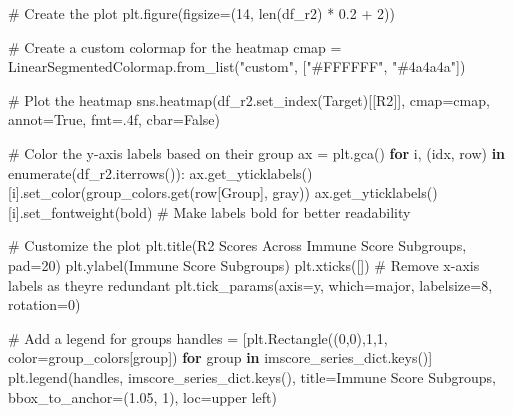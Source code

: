\documentclass[
  letterpaper,
  DIV=11,
  numbers=noendperiod]{scrartcl}
\newenvironment{Shaded}{\begin{snugshade}}{\end{snugshade}}
\newcommand{\BuiltInTok}[1]{\textcolor[rgb]{0.00,0.23,0.31}{#1}}
\newcommand{\CommentTok}[1]{\textcolor[rgb]{0.37,0.37,0.37}{#1}}
\newcommand{\ControlFlowTok}[1]{\textcolor[rgb]{0.00,0.23,0.31}{\textbf{#1}}}
\newcommand{\DecValTok}[1]{\textcolor[rgb]{0.68,0.00,0.00}{#1}}
\newcommand{\FloatTok}[1]{\textcolor[rgb]{0.68,0.00,0.00}{#1}}
\newcommand{\KeywordTok}[1]{\textcolor[rgb]{0.00,0.23,0.31}{\textbf{#1}}}
\newcommand{\NormalTok}[1]{\textcolor[rgb]{0.00,0.23,0.31}{#1}}
\newcommand{\OperatorTok}[1]{\textcolor[rgb]{0.37,0.37,0.37}{#1}}
\newcommand{\StringTok}[1]{\textcolor[rgb]{0.13,0.47,0.30}{#1}}
\newcommand{\VariableTok}[1]{\textcolor[rgb]{0.07,0.07,0.07}{#1}}
\begin{document}
\begin{Shaded}
\begin{Highlighting}[]
\CommentTok{\# Create the plot}
\NormalTok{plt.figure(figsize}\OperatorTok{=}\NormalTok{(}\DecValTok{14}\NormalTok{, }\BuiltInTok{len}\NormalTok{(df\_r2) }\OperatorTok{*} \FloatTok{0.2} \OperatorTok{+} \DecValTok{2}\NormalTok{))}

\CommentTok{\# Create a custom colormap for the heatmap}
\NormalTok{cmap }\OperatorTok{=}\NormalTok{ LinearSegmentedColormap.from\_list(}\StringTok{"custom"}\NormalTok{, [}\StringTok{"\#FFFFFF"}\NormalTok{, }\StringTok{"\#4a4a4a"}\NormalTok{])}

\CommentTok{\# Plot the heatmap}
\NormalTok{sns.heatmap(df\_r2.set\_index(}\StringTok{\textquotesingle{}Target\textquotesingle{}}\NormalTok{)[[}\StringTok{\textquotesingle{}R2\textquotesingle{}}\NormalTok{]], cmap}\OperatorTok{=}\NormalTok{cmap, annot}\OperatorTok{=}\VariableTok{True}\NormalTok{, fmt}\OperatorTok{=}\StringTok{\textquotesingle{}.4f\textquotesingle{}}\NormalTok{, cbar}\OperatorTok{=}\VariableTok{False}\NormalTok{)}

\CommentTok{\# Color the y{-}axis labels based on their group}
\NormalTok{ax }\OperatorTok{=}\NormalTok{ plt.gca()}
\ControlFlowTok{for}\NormalTok{ i, (idx, row) }\KeywordTok{in} \BuiltInTok{enumerate}\NormalTok{(df\_r2.iterrows()):}
\NormalTok{    ax.get\_yticklabels()[i].set\_color(group\_colors.get(row[}\StringTok{\textquotesingle{}Group\textquotesingle{}}\NormalTok{], }\StringTok{\textquotesingle{}gray\textquotesingle{}}\NormalTok{))}
\NormalTok{    ax.get\_yticklabels()[i].set\_fontweight(}\StringTok{\textquotesingle{}bold\textquotesingle{}}\NormalTok{)  }\CommentTok{\# Make labels bold for better readability}

\CommentTok{\# Customize the plot}
\NormalTok{plt.title(}\StringTok{\textquotesingle{}R2 Scores Across Immune Score Subgroups\textquotesingle{}}\NormalTok{, pad}\OperatorTok{=}\DecValTok{20}\NormalTok{)}
\NormalTok{plt.ylabel(}\StringTok{\textquotesingle{}Immune Score Subgroups\textquotesingle{}}\NormalTok{)}
\NormalTok{plt.xticks([])  }\CommentTok{\# Remove x{-}axis labels as they\textquotesingle{}re redundant}
\NormalTok{plt.tick\_params(axis}\OperatorTok{=}\StringTok{\textquotesingle{}y\textquotesingle{}}\NormalTok{, which}\OperatorTok{=}\StringTok{\textquotesingle{}major\textquotesingle{}}\NormalTok{, labelsize}\OperatorTok{=}\DecValTok{8}\NormalTok{, rotation}\OperatorTok{=}\DecValTok{0}\NormalTok{)}

\CommentTok{\# Add a legend for groups}
\NormalTok{handles }\OperatorTok{=}\NormalTok{ [plt.Rectangle((}\DecValTok{0}\NormalTok{,}\DecValTok{0}\NormalTok{),}\DecValTok{1}\NormalTok{,}\DecValTok{1}\NormalTok{, color}\OperatorTok{=}\NormalTok{group\_colors[group]) }\ControlFlowTok{for}\NormalTok{ group }\KeywordTok{in}\NormalTok{ imscore\_series\_dict.keys()]}
\NormalTok{plt.legend(handles, imscore\_series\_dict.keys(), title}\OperatorTok{=}\StringTok{\textquotesingle{}Immune Score Subgroups\textquotesingle{}}\NormalTok{, bbox\_to\_anchor}\OperatorTok{=}\NormalTok{(}\FloatTok{1.05}\NormalTok{, }\DecValTok{1}\NormalTok{), loc}\OperatorTok{=}\StringTok{\textquotesingle{}upper left\textquotesingle{}}\NormalTok{)}


\end{Highlighting}
\end{Shaded}
\end{document}
